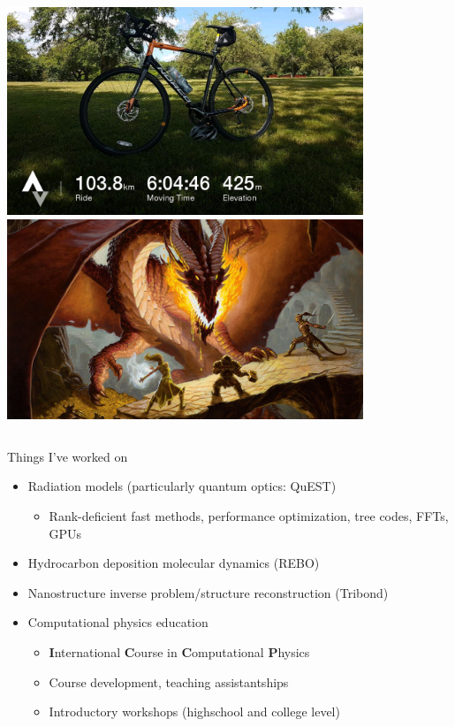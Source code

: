\documentclass[aspectratio=169]{beamer}
\begin{document}
\begin{frame}
\begin{columns}[c]
      \includegraphics[width=0.8\textwidth]{figures/strava_cropped.jpg} \vspace{0.6cm}
      \includegraphics[width=0.8\textwidth]{figures/dnd.jpg}
  \end{columns}
\end{frame}

\begin{frame}{Things I've worked on}
  \begin{itemize}
    \item Radiation models (particularly quantum optics: QuEST)
      \begin{itemize}
        \item Rank-deficient fast methods, performance optimization, tree codes, FFTs, GPUs
      \end{itemize}
    \item Hydrocarbon deposition molecular dynamics (REBO)
    \item Nanostructure inverse problem/structure reconstruction (Tribond)
    \item Computational physics education
      \begin{itemize}
        \item \textbf{I}nternational \textbf{C}ourse in \textbf{C}omputational \textbf{P}hysics
        \item Course development, teaching assistantships
        \item Introductory workshops (highschool and college level)
      \end{itemize}
  \end{itemize}
\end{frame}
\end{document}
